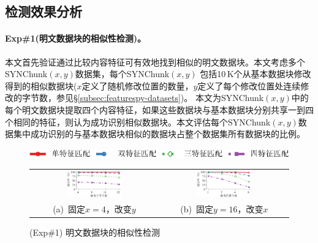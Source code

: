 \subsection{检测效果分析}
\label{subsec:featurespy-evaluation-detection}

\paragraph*{Exp\#1(明文数据块的相似性检测)。}本文首先验证通过比较内容特征可有效地找到相似的明文数据块。本文考虑多个SYNChunk$(x, y)$数据集，每个SYNChunk$(x, y)$ 包括10\,K个从基本数据块修改得到的相似数据块($x$定义了随机修改位置的数量，$y$定义了每个修改位置处连续修改的字节数，参见\S\ref{subsec:featurespy-datasets})。 本文为SYNChunk$(x, y)$中的每个明文数据块提取四个内容特征，如果这些数据块与基本数据块分别共享一到四个相同的特征，则认为成功识别相似数据块。本文评估每个SYNChunk$(x, y)$数据集中成功识别的与基本数据块相似的数据块占整个数据集所有数据块的比例。

\begin{figure}[!htb]
  \centering
  \includegraphics[height=10.5pt]{pic/featurespy/plot/detection/syn/fixed_pq_legend.pdf}
  \vspace{5pt}\\
  \begin{tabular}{@{\ }c@{\ }c}
    \includegraphics[width=0.45\textwidth]{pic/featurespy/plot/detection/syn/fixed_p_4.pdf} &
    \includegraphics[width=0.45\textwidth]{pic/featurespy/plot/detection/syn/fixed_q_16.pdf}  \\
    \mbox{\small (a) 固定$x=4$，改变$y$}                                                    &
    \mbox{\small (b) 固定$y=16$，改变$x$}                                                     \\
  \end{tabular}
  \caption{(Exp\#1) 明文数据块的相似性检测}
  \label{fig:featurespy-expDetectionSynSim}
\end{figure}

